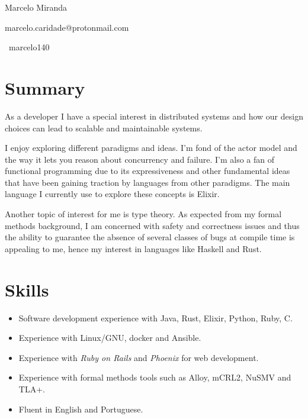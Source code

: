 \documentclass[a4paper,10pt]{article}
\begin{document}
\pagestyle{empty} %

\begin{center}
\Huge{Marcelo Miranda}

\small{marcelo.caridade@protonmail.com}

\small{\faGithub \, marcelo140}
\bigskip\par
\end{center}

\section{Summary}
\small{As a developer I have a special interest in distributed systems and how our design choices can lead to scalable and maintainable systems. 

I enjoy exploring different paradigms and ideas. I'm fond of the actor model and the way it lets you reason about concurrency and failure. I'm also a fan of functional programming due to its expressiveness and other fundamental ideas that have been gaining traction by languages from other paradigms. The main language I currently use to explore these concepts is Elixir.

Another topic of interest for me is type theory. As expected from my formal methods background, I am concerned with safety and correctness issues and thus the ability to guarantee the absence of several classes of bugs at compile time is appealing to me, hence my interest in languages like Haskell and Rust.}

\section{Skills}

\begin{itemize}
    \item Software development experience with Java, Rust, Elixir, Python, Ruby, C.
    \item Experience with Linux/GNU, docker and Ansible.
    \item Experience with \textit{Ruby on Rails} and \textit{Phoenix} for web development.
    \item Experience with formal methods tools such as Alloy, mCRL2, NuSMV and TLA+.
    \item Fluent in English and Portuguese.
\end{itemize}
\end{document}
